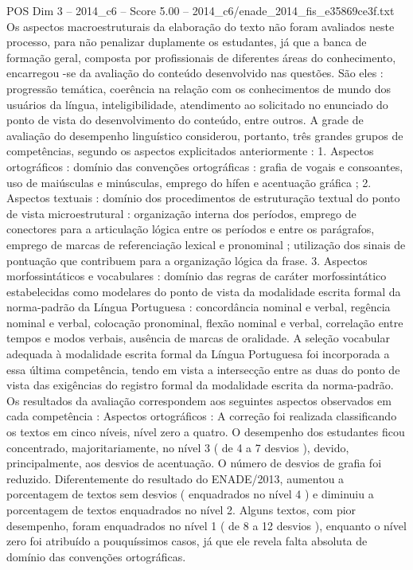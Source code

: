 \begin{textsample}{POS Dim 3 – 2014\_c6 – Score 5.00 – 2014\_c6/enade\_2014\_fis\_e35869ce3f.txt}
Os aspectos macroestruturais da elaboração do texto não foram avaliados neste processo, para não penalizar duplamente os estudantes, já que a banca de formação geral, composta por profissionais de diferentes áreas do conhecimento, encarregou -se da avaliação do conteúdo desenvolvido nas questões.
São eles : progressão temática, coerência na relação com os conhecimentos de mundo dos usuários da língua, inteligibilidade, atendimento ao solicitado no enunciado do ponto de vista do desenvolvimento do conteúdo, entre outros.
A grade de avaliação do desempenho linguístico considerou, portanto, três grandes grupos de competências, segundo os aspectos explicitados anteriormente : 1.
Aspectos ortográficos : domínio das convenções ortográficas : grafia de vogais e consoantes, uso de maiúsculas e minúsculas, emprego do hífen e acentuação gráfica ; 2.
Aspectos textuais : domínio dos procedimentos de estruturação textual do ponto de vista microestrutural : organização interna dos períodos, emprego de conectores para a articulação lógica entre os períodos e entre os parágrafos, emprego de marcas de referenciação lexical e pronominal ; utilização dos sinais de pontuação que contribuem para a organização lógica da frase. 3.
Aspectos morfossintáticos e vocabulares : domínio das regras de caráter morfossintático estabelecidas como modelares do ponto de vista da modalidade escrita formal da norma-padrão da Língua Portuguesa : concordância nominal e verbal, regência nominal e verbal, colocação pronominal, flexão nominal e verbal, correlação entre tempos e modos verbais, ausência de marcas de oralidade.
A seleção vocabular adequada à modalidade escrita formal da Língua Portuguesa foi incorporada a essa última competência, tendo em vista a intersecção entre as duas do ponto de vista das exigências do registro formal da modalidade escrita da norma-padrão.
Os resultados da avaliação correspondem aos seguintes aspectos observados em cada competência : Aspectos ortográficos : A correção foi realizada classificando os textos em cinco níveis, nível zero a quatro.
O desempenho dos estudantes ficou concentrado, majoritariamente, no nível 3 ( de 4 a 7 desvios ), devido, principalmente, aos desvios de acentuação.
O número de desvios de grafia foi reduzido.
Diferentemente do resultado do ENADE/2013, aumentou a porcentagem de textos sem desvios ( enquadrados no nível 4 ) e diminuiu a porcentagem de textos enquadrados no nível 2.
Alguns textos, com pior desempenho, foram enquadrados no nível 1 ( de 8 a 12 desvios ), enquanto o nível zero foi atribuído a pouquíssimos casos, já que ele revela falta absoluta de domínio das convenções ortográficas.

\end{textsample}
